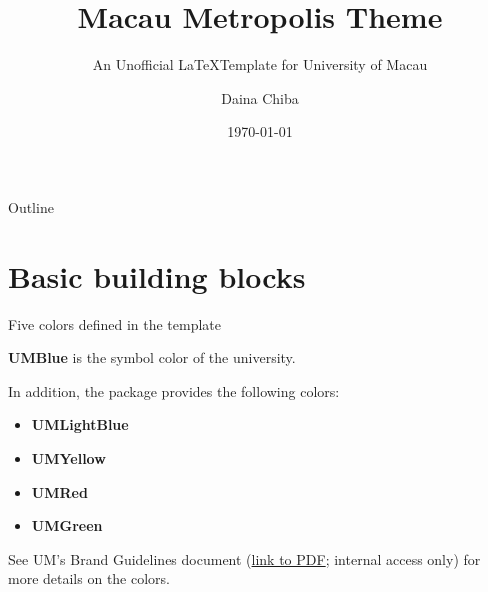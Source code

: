 \documentclass[12pt]{beamer}
\title{Macau Metropolis Theme}
\subtitle{An Unofficial \LaTeX \space Template for University of Macau}
\date{\today}
\author{Daina Chiba}
\institute{University of Macau}
\begin{document}
\maketitle %
\begin{frame}[plain]{Outline} %
	\tableofcontents
\end{frame} 



\section{Basic building blocks}


\begin{frame}{{\color{UMYellow} Five colors} defined in the template}

{\color{UMBlue}\bf UMBlue} is the symbol color of the university.

In addition, the package provides the following colors:
\begin{itemize}
    \item {\color{UMLightBlue}\bf UMLightBlue}
    \item {\color{UMYellow}\bf UMYellow}
	\item {\color{UMRed}\bf UMRed}
	\item {\color{UMGreen}\bf UMGreen}
\end{itemize}

\vspace{10pt}
See UM's Brand Guidelines document (\href{https://identity.co.um.edu.mo/wp-content/uploads/2021/06/University-of-Macau-Brand-Guidelines.pdf}{\myURL link to PDF}; internal access only) for more details on the colors.
\end{frame}
\end{document}
